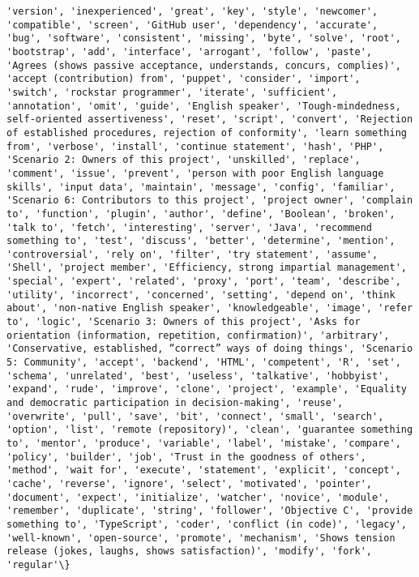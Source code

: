 \documentclass[11pt]{article}
\begin{document}
\begin{Verbatim}[commandchars=\\\{\}]
'version', 'inexperienced', 'great', 'key', 'style', 'newcomer', 'compatible', 'screen', 'GitHub user', 'dependency', 'accurate', 'bug', 'software', 'consistent', 'missing', 'byte', 'solve', 'root', 'bootstrap', 'add', 'interface', 'arrogant', 'follow', 'paste', 'Agrees (shows passive acceptance, understands, concurs, complies)', 'accept (contribution) from', 'puppet', 'consider', 'import', 'switch', 'rockstar programmer', 'iterate', 'sufficient', 'annotation', 'omit', 'guide', 'English speaker', 'Tough-mindedness, self-oriented assertiveness', 'reset', 'script', 'convert', 'Rejection of established procedures, rejection of conformity', 'learn something from', 'verbose', 'install', 'continue statement', 'hash', 'PHP', 'Scenario 2: Owners of this project', 'unskilled', 'replace', 'comment', 'issue', 'prevent', 'person with poor English language skills', 'input data', 'maintain', 'message', 'config', 'familiar', 'Scenario 6: Contributors to this project', 'project owner', 'complain to', 'function', 'plugin', 'author', 'define', 'Boolean', 'broken', 'talk to', 'fetch', 'interesting', 'server', 'Java', 'recommend something to', 'test', 'discuss', 'better', 'determine', 'mention', 'controversial', 'rely on', 'filter', 'try statement', 'assume', 'Shell', 'project member', 'Efficiency, strong impartial management', 'special', 'expert', 'related', 'proxy', 'port', 'team', 'describe', 'utility', 'incorrect', 'concerned', 'setting', 'depend on', 'think about', 'non-native English speaker', 'knowledgeable', 'image', 'refer to', 'logic', 'Scenario 3: Owners of this project', 'Asks for orientation (information, repetition, confirmation)', 'arbitrary', 'Conservative, established, “correct” ways of doing things', 'Scenario 5: Community', 'accept', 'backend', 'HTML', 'competent', 'R', 'set', 'schema', 'unrelated', 'best', 'useless', 'talkative', 'hobbyist', 'expand', 'rude', 'improve', 'clone', 'project', 'example', 'Equality and democratic participation in decision-making', 'reuse', 'overwrite', 'pull', 'save', 'bit', 'connect', 'small', 'search', 'option', 'list', 'remote (repository)', 'clean', 'guarantee something to', 'mentor', 'produce', 'variable', 'label', 'mistake', 'compare', 'policy', 'builder', 'job', 'Trust in the goodness of others', 'method', 'wait for', 'execute', 'statement', 'explicit', 'concept', 'cache', 'reverse', 'ignore', 'select', 'motivated', 'pointer', 'document', 'expect', 'initialize', 'watcher', 'novice', 'module', 'remember', 'duplicate', 'string', 'follower', 'Objective C', 'provide something to', 'TypeScript', 'coder', 'conflict (in code)', 'legacy', 'well-known', 'open-source', 'promote', 'mechanism', 'Shows tension release (jokes, laughs, shows satisfaction)', 'modify', 'fork', 'regular'\}

    \end{Verbatim}
\end{document}
